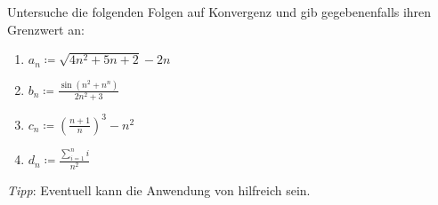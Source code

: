 \begin{exercise}
  Untersuche die folgenden Folgen auf Konvergenz und gib gegebenenfalls ihren
  Grenzwert an:
  \begin{enumerate}
  \item $\displaystyle a_n \coloneqq \sqrt{4n^2 + 5n + 2} - 2n$
  \item $\displaystyle b_n \coloneqq \frac{\sin(n^2 + n^n)}{2n^2 + 3}$
  \item $\displaystyle c_n \coloneqq \left( \frac{n + 1}{n} \right)^3 - n^2$
  \item $\displaystyle d_n \coloneqq \frac{\sum_{i = 1}^n i}{n^2}$
  \end{enumerate}
  \emph{Tipp}: Eventuell kann die Anwendung von 
  hilfreich sein.
\end{exercise}
